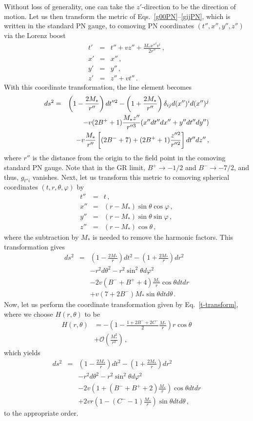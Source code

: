 \documentclass[prd,aps,twocolumn,nofootinbib,showpacs,superscriptaddress]{revtex4-1}
\newcommand\ba{\begin{eqnarray}}
\newcommand\ea{\end{eqnarray}}
\newcommand{\nn}{\nonumber}
\newcommand{\NS}{*}
\begin{document}
Without loss of generality, one can take the $z'$-direction to be the
direction of motion.
Let us then transform the metric of Eqs.~\eqref{g00PN}--\eqref{gijPN},
which is written in the standard PN gauge, to comoving PN coordinates
$(t'',x'',y'',z'')$ via the Lorenz boost
%
\ba t' &=& t''+vz''+\frac{M_* x''^i v^i}{2r''}\,, \\ x' &=& x''\,,
\\ y' &=& y''\,, \\ z' &=& z''+vt''\,. \ea  
%
With this coordinate transformation, the line element becomes 
%
 \ba ds^2 &=& \left( 1-\frac{2M_*}{r''} \right) dt''^2 - \left(
1+\frac{2M_*}{r''} \right) \delta_{ij}d(x'')^i d(x'')^j \nn \\ & &   - v
(2B^{+}+1) \frac{M_* z''}{r''^3} (x''dt''dx'' + y'' dt''dy'') \nn\\&&\hspace{-.2cm}- v \frac{M_*}{r''} \left[ (2B^{-}+7) +
  (2B^{+}+1) \frac{z''^2}{r''^2} \right]dt''dz''\,, 
\ea
%
where $r''$ is the distance from the origin to the field point in the
comoving standard PN gauge. Note that in the GR limit, $B^{+} \to
-1/2$ and $B^{-} \to -7/2$, and thus, $g_{t''i}$ vanishes. Next, let us transform this metric
to comoving spherical coordinates
$(t,r,\theta,\varphi)$ by
%
\ba t'' &=& t\,, \\ x'' &=& (r-M_*) \sin\theta \cos\varphi\,, \\ y''
&=& (r-M_*) \sin\theta \sin\varphi\,, \\ z'' &=& (r-M_*) \cos\theta\,,
\ea
%
where the subtraction by $M_{*}$ is needed to remove the harmonic
factors. This transformation gives 
%
\ba
\label{metric-Foster-sph0}
ds^2 &=& \left( 1-\frac{2M_*}{r} \right) dt^2 - \left( 1 +
\frac{2M_*}{r} \right) dr^2\nn\\ && - r^2 d\theta^2 - r^2 \sin^2 \theta
d\varphi^2 \nn \\ & &   -2 v (B^{-} + B^{+}+4) \frac{M_*}{r} \cos \theta
dt dr \nn\\ && + v (7+2B^{-}) M_*  \sin\theta dt d\theta\,. 
\ea
Now, let us perform the coordinate transformation given by
Eq.~\eqref{t-transform}, where we choose $H(r,\theta)$ to be 
%
\begin{align} 
H(r,\theta) &= - \left( 1 -  \frac{1+2 B^{-}+2 C^{-}}{2}
\frac{M_\NS}{r} \right) r \cos\theta 
\nn \\ 
&+ \mathcal{O} \left(\frac{M_\NS^2}{r^2} \right)\,, 
\end{align}
which yields
%
\ba
\label{metric-Foster-sph}
ds^2 &=& \left( 1-\frac{2M_*}{r} \right) dt^2 - \left( 1 +
\frac{2M_*}{r} \right) dr^2 \nn\\&&- r^2 d\theta^2 - r^2 \sin^2 \theta
d\varphi^2 \nn \\ & &   -2 v \left( 1+ (B^{-} + B^{+}+2) \frac{M_*}{r}
\right) \cos \theta dt dr \nn\\&&+ 2v r \left( 1- (C^{-}-1) \frac{M_*}{r}
\right) \sin\theta dt d\theta\,,
\ea
to the appropriate order. 
\end{document}

